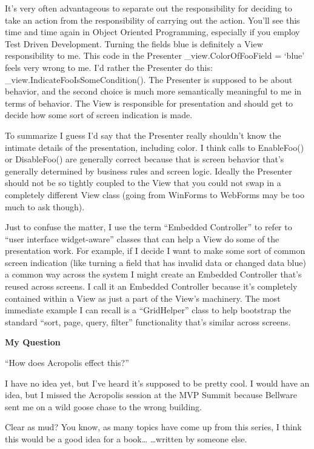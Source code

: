 \documentclass{article}
\begin{document}
{It's very often advantageous to separate out the responsibility for deciding to take an action from the responsibility of carrying out the action.  You'll see this time and time again in Object Oriented Programming, especially if you employ Test Driven Development.  Turning the fields blue is definitely a View responsibility to me.  This code in the Presenter  \_view.ColorOfFooField = ‘blue'  feels very wrong to me.  I'd rather the Presenter do this:  \_view.IndicateFooIsSomeCondition().  The Presenter is supposed to be about behavior, and the second choice is much more semantically meaningful to me in terms of behavior.  The View is responsible for presentation and should get to decide how some sort of screen indication is made.

To summarize I guess I'd say that the Presenter really shouldn't know the intimate details of the presentation, including color.  I think calls to EnableFoo() or DisableFoo() are generally correct because that is screen behavior that's generally determined by business rules and screen logic.  Ideally the Presenter should not be so tightly coupled to the View that you could not swap in a completely different View class (going from WinForms to WebForms may be too much to ask though).

Just to confuse the matter, I use the term “Embedded Controller” to refer to “user interface widget-aware” classes that can help a View do some of the presentation work.  For example, if I decide I want to make some sort of common screen indication (like turning a field that has invalid data or changed data blue) a common way across the system I might create an Embedded Controller that's reused across screens.  I call it an Embedded Controller because it's completely contained within a View as just a part of the View's machinery.  The most immediate example I can recall is a “GridHelper” class to help bootstrap the standard “sort, page, query, filter” functionality that's similar across screens.

 
\Large {\textbf{My Question}}

    “How does Acropolis effect this?”

I have no idea yet, but I've heard it's supposed to be pretty cool.  I would have an idea, but I missed the Acropolis session at the MVP Summit because Bellware sent me on a wild goose chase to the wrong building.

 

 

Clear as mud?  You know, as many topics have come up from this series, I think this would be a good idea for a book…              …written by someone else.

}
\end{document}
